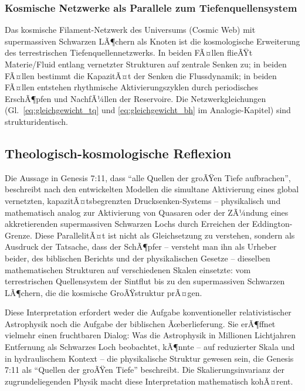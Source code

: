 ﻿\documentclass[12pt,a4paper]{report}
\begin{document}
\subsubsection{Kosmische Netzwerke als Parallele zum Tiefenquellensystem}

Das kosmische Filament-Netzwerk des Universums (Cosmic Web) mit supermassiven Schwarzen LÃ¶chern als Knoten \cite{bond1996,kormendy2013} ist die kosmologische Erweiterung des terrestrischen Tiefenquellennetzwerks. In beiden FÃ¤llen flieÃŸt Materie/Fluid entlang vernetzter Strukturen auf zentrale Senken zu; in beiden FÃ¤llen bestimmt die KapazitÃ¤t der Senken die Flussdynamik; in beiden FÃ¤llen entstehen rhythmische Aktivierungszyklen durch periodisches ErschÃ¶pfen und NachfÃ¼llen der Reservoire. Die Netzwerkgleichungen (Gl.~\ref{eq:gleichgewicht_tq} und \ref{eq:gleichgewicht_bh} im Analogie-Kapitel) sind strukturidentisch.

\subsection{Theologisch-kosmologische Reflexion}

Die Aussage in Genesis 7:11, dass "`alle Quellen der groÃŸen Tiefe aufbrachen"', beschreibt nach den entwickelten Modellen die simultane Aktivierung eines global vernetzten, kapazitÃ¤tsbegrenzten Drucksenken-Systems -- physikalisch und mathematisch analog zur Aktivierung von Quasaren oder der ZÃ¼ndung eines akkretierenden supermassiven Schwarzen Lochs durch Erreichen der Eddington-Grenze. Diese ParallelitÃ¤t ist nicht als Gleichsetzung zu verstehen, sondern als Ausdruck der Tatsache, dass der SchÃ¶pfer -- versteht man ihn als Urheber beider, des biblischen Berichts und der physikalischen Gesetze -- dieselben mathematischen Strukturen auf verschiedenen Skalen einsetzte: vom terrestrischen Quellensystem der Sintflut bis zu den supermassiven Schwarzen LÃ¶chern, die die kosmische GroÃŸstruktur prÃ¤gen.

Diese Interpretation erfordert weder die Aufgabe konventioneller relativistischer Astrophysik noch die Aufgabe der biblischen Ãœberlieferung. Sie erÃ¶ffnet vielmehr einen fruchtbaren Dialog: Was die Astrophysik in Millionen Lichtjahren Entfernung als Schwarzes Loch beobachtet, kÃ¶nnte -- auf reduzierter Skala und in hydraulischem Kontext -- die physikalische Struktur gewesen sein, die Genesis 7:11 als "`Quellen der groÃŸen Tiefe"' beschreibt. Die Skalierungsinvarianz der zugrundeliegenden Physik macht diese Interpretation mathematisch kohÃ¤rent.
\end{document}
